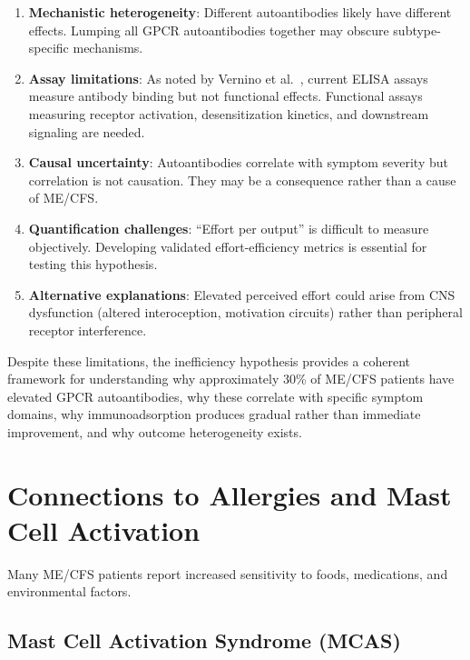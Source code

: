 \begin{speculation}
\begin{enumerate}
    \item \textbf{Mechanistic heterogeneity}: Different autoantibodies likely have different effects. Lumping all GPCR autoantibodies together may obscure subtype-specific mechanisms.

    \item \textbf{Assay limitations}: As noted by Vernino et al.~\cite{POTS2022failed_replication}, current ELISA assays measure antibody binding but not functional effects. Functional assays measuring receptor activation, desensitization kinetics, and downstream signaling are needed.

    \item \textbf{Causal uncertainty}: Autoantibodies correlate with symptom severity but correlation is not causation. They may be a consequence rather than a cause of ME/CFS.

    \item \textbf{Quantification challenges}: ``Effort per output'' is difficult to measure objectively. Developing validated effort-efficiency metrics is essential for testing this hypothesis.

    \item \textbf{Alternative explanations}: Elevated perceived effort could arise from CNS dysfunction (altered interoception, motivation circuits) rather than peripheral receptor interference.
\end{enumerate}

Despite these limitations, the inefficiency hypothesis provides a coherent framework for understanding why approximately 30\% of ME/CFS patients have elevated GPCR autoantibodies, why these correlate with specific symptom domains, why immunoadsorption produces gradual rather than immediate improvement, and why outcome heterogeneity exists.
\end{speculation}

\section{Connections to Allergies and Mast Cell Activation}
\label{sec:allergies-mast-cells}

Many ME/CFS patients report increased sensitivity to foods, medications, and environmental factors.

\subsection{Mast Cell Activation Syndrome (MCAS)}
\label{sec:mcas}


